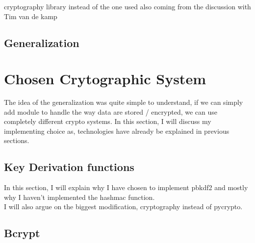 \documentclass{eplmastersthesis}
\begin{document}
cryptography library instead of the one used also coming from the discussion with Tim van de kamp

\subsection{Generalization}

\section{Chosen Crytographic System}
The idea of the generalization was quite simple to understand, if we can simply add module to handle the way data are stored / encrypted, we can use completely different crypto systems. In this section, I will discuss my implementing choice as, technologies have already be explained in previous sections.

\subsection{Key Derivation functions}
In this section, I will explain why I have chosen to implement pbkdf2 and mostly why I haven't implemented the hashmac function.\\
I will also argue on the biggest modification, cryptography instead of pycrypto.

\subsection{Bcrypt}
\end{document}
